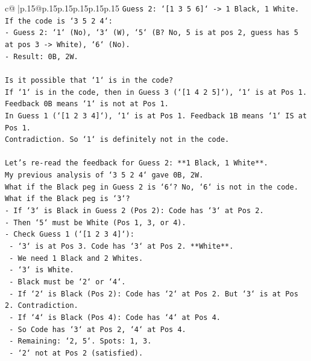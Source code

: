 \documentclass{article}
\begin{document}
{\begin{supertabular}{c@{$\;$}|p{.15\linewidth}@{}p{.15\linewidth}p{.15\linewidth}p{.15\linewidth}p{.15\linewidth}p{.15\linewidth}}
{{{\texttt{Guess 2: `{[}1 3 5 6{]}` {-}> 1 Black, 1 White.} \\
\texttt{If the code is `3 5 2 4`:} \\
\texttt{{-}   Guess 2: `1` (No), `3` (W), `5` (B? No, 5 is at pos 2, guess has 5 at pos 3 {-}> White), `6` (No).} \\
\texttt{{-}   Result: 0B, 2W.} \\
\\ 
\texttt{Is it possible that `1` is in the code?} \\
\texttt{If `1` is in the code, then in Guess 3 (`{[}1 4 2 5{]}`), `1` is at Pos 1. Feedback 0B means `1` is not at Pos 1.} \\
\texttt{In Guess 1 (`{[}1 2 3 4{]}`), `1` is at Pos 1. Feedback 1B means `1` IS at Pos 1.} \\
\texttt{Contradiction. So `1` is definitely not in the code.} \\
\\ 
\texttt{Let's re{-}read the feedback for Guess 2: **1 Black, 1 White**.} \\
\texttt{My previous analysis of `3 5 2 4` gave 0B, 2W.} \\
\texttt{What if the Black peg in Guess 2 is `6`? No, `6` is not in the code.} \\
\texttt{What if the Black peg is `3`?} \\
\texttt{{-}   If `3` is Black in Guess 2 (Pos 2): Code has `3` at Pos 2.} \\
\texttt{{-}   Then `5` must be White (Pos 1, 3, or 4).} \\
\texttt{{-}   Check Guess 1 (`{[}1 2 3 4{]}`):} \\
\texttt{    {-}   `3` is at Pos 3. Code has `3` at Pos 2. **White**.} \\
\texttt{    {-}   We need 1 Black and 2 Whites.} \\
\texttt{    {-}   `3` is White.} \\
\texttt{    {-}   Black must be `2` or `4`.} \\
\texttt{    {-}   If `2` is Black (Pos 2): Code has `2` at Pos 2. But `3` is at Pos 2. Contradiction.} \\
\texttt{    {-}   If `4` is Black (Pos 4): Code has `4` at Pos 4.} \\
\texttt{    {-}   So Code has `3` at Pos 2, `4` at Pos 4.} \\
\texttt{    {-}   Remaining: `2, 5`. Spots: 1, 3.} \\
\texttt{    {-}   `2` not at Pos 2 (satisfied).} \\
}}}
\end{supertabular}}
\end{document}
